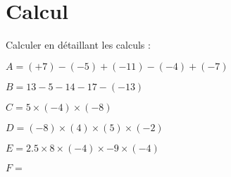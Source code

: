 \section{Calcul}

Calculer en détaillant les calculs :

\begin{questions}
	\question $A = (+7) - (-5) + (-11) - (-4) + (-7)$
	
	\question $B = 13 - 5 - 14 - 17 - (-13)$
	
	\question $C = 5 \times (- 4) \times (-8)$
	
	\question $D = (\num{-8}) \times (\num{4}) \times (\num{5}) \times (\num{-2})$
	
	\question $E = \num{2.5} \times \num{8} \times (\num{-4}) \times \num{-9} \times (-4)$
	
	\question $F = $
\end{questions} 